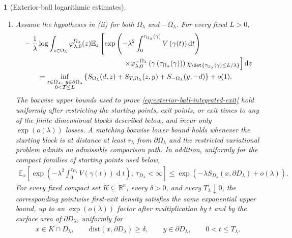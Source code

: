 \documentclass[a4paper,10pt]{article}
\numberwithin{equation}{section}
\theoremstyle{plain}
\theoremstyle{plain}
\newtheorem{lem}[thm]{\protect\lemmaname}
\theoremstyle{plain}
\theoremstyle{plain}
\theoremstyle{plain}
\theoremstyle{remark}
\theoremstyle{definition}
\providecommand{\lemmaname}{Lemma}
\newcommand{\RR}{\mathbb{R}}
\newcommand{\EE}{\mathbb{E}}
\newcommand{\dif}{\operatorname{d}\!} %
\newcommand{\vf}{\varphi}
\newcommand{\dist}{\mathrm{dist}}
\newcommand{\eq}[1]{\begin{align*}#1\end{align*}}
\newcommand{\eql}[1]{\begin{align}#1\end{align}}
\newcommand{\br}[1]{\left(#1\right)}
\begin{document}
\begin{lem}[Exterior-ball logarithmic estimates]
\begin{enumerate}[label=\textnormal{(\roman*)}]
\item
Assume the hypotheses in \textnormal{(ii)} for both
$\Omega_\lambda$ and $-\Omega_\lambda$. For every fixed $L>0$,
\eql{
&-\frac1\lambda
\log
\int_{z\in\Omega_\lambda}
\vf_{\lambda,0}^{\Omega_\lambda}(z)
\EE_z\left[
\exp\left(
-\lambda^2
\int_0^{\tau_{\Omega_\lambda}(\gamma)}
V\br{\gamma(t)}
\dif{t}
\right)
\right.
\nonumber\\
&\hspace{14em}\left.
\times
\vf_{\lambda,0}^{-\Omega_\lambda}
\br{
\gamma\br{
\tau_{\Omega_\lambda}(\gamma)
}
}
\chi_{\Set{
\tau_{\Omega_\lambda}(\gamma)
\leq
L/\lambda
}}
\right]
\dif{z}
\nonumber\\
&\qquad=
\inf_{\substack{
z\in\Omega_\lambda,\ 
y\in\partial\Omega_\lambda\\
0<T\leq L
}}
\left\{
S_{\Omega_\lambda}(d,z)
+
S_{T,\Omega_\lambda}(z,y)
+
S_{-\Omega_\lambda}(y,-d)
\right\}
+o(1).
\label{eq:exterior-ball-integrated-exit}
}
The boxwise upper bounds used to prove
\cref{eq:exterior-ball-integrated-exit} hold uniformly after restricting
the starting points, exit points, or exit times to any of the
finite-dimensional blocks described below, and incur only
$\exp(o(\lambda))$ losses. A matching boxwise lower bound holds whenever
the starting block is at distance at least $r_\lambda$ from
$\partial\Omega_\lambda$ and the restricted variational problem admits
an admissible comparison path. In addition, uniformly for the compact families of starting points used below,
\eq{
\EE_x\left[
\exp\left(
-\lambda^2\int_0^{\tau_{D_\lambda}}V(\gamma(t))\dif{t}
\right);
\ \tau_{D_\lambda}<\infty
\right]
\leq
\exp\left(
-\lambda S_{D_\lambda}\br{x,\partial D_\lambda}+o(\lambda)
\right).
}
For every fixed compact set $K\subseteq\RR^n$, every $\delta>0$,
and every $T_\lambda\downarrow0$, the corresponding pointwise
first-exit density satisfies the same exponential upper bound, up to
an $\exp(o(\lambda))$ factor after multiplication by $t$ and by the
surface area of $\partial D_\lambda$, uniformly for
\eq{
x\in K\cap D_\lambda,
\qquad
\dist\br{x,\partial D_\lambda}\geq\delta,
\qquad
y\in\partial D_\lambda,
\qquad
0<t\leq T_\lambda.
}

\end{enumerate}
\end{lem}
\end{document}
